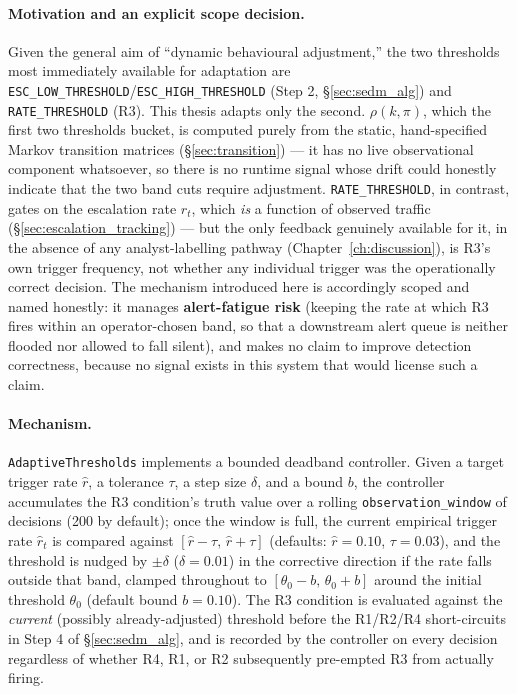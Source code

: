 \paragraph{Motivation and an explicit scope decision.}
Given the general aim of ``dynamic behavioural adjustment,'' the two
thresholds most immediately available for adaptation are
\texttt{ESC\_LOW\_THRESHOLD}/\texttt{ESC\_HIGH\_THRESHOLD} (Step 2,
\S\ref{sec:sedm_alg}) and \texttt{RATE\_THRESHOLD} (R3). This thesis adapts
only the second. $\rho(k, \pi)$, which the first two thresholds bucket, is
computed purely from the static, hand-specified Markov transition matrices
(\S\ref{sec:transition}) — it has no live observational component
whatsoever, so there is no runtime signal whose drift could honestly
indicate that the two band cuts require adjustment. \texttt{RATE\_THRESHOLD},
in contrast, gates on the escalation rate $r_t$, which \emph{is} a function
of observed traffic (\S\ref{sec:escalation_tracking}) — but the only
feedback genuinely available for it, in the absence of any analyst-labelling
pathway (Chapter~\ref{ch:discussion}), is R3's own trigger frequency, not
whether any individual trigger was the operationally correct decision. The
mechanism introduced here is accordingly scoped and named honestly: it
manages \textbf{alert-fatigue risk} (keeping the rate at which R3 fires
within an operator-chosen band, so that a downstream alert queue is neither
flooded nor allowed to fall silent), and makes no claim to improve
detection correctness, because no signal exists in this system that would
license such a claim.

\paragraph{Mechanism.}
\texttt{AdaptiveThresholds} implements a bounded deadband controller. Given
a target trigger rate $\hat{r}$, a tolerance $\tau$, a step size $\delta$,
and a bound $b$, the controller accumulates the R3 condition's truth value
over a rolling \texttt{observation\_window} of decisions (200 by default);
once the window is full, the current empirical trigger rate $\hat{r}_t$ is
compared against $[\hat{r} - \tau,\, \hat{r} + \tau]$ (defaults:
$\hat{r} = 0.10$, $\tau = 0.03$), and the threshold is nudged by $\pm\delta$
($\delta = 0.01$) in the corrective direction if the rate falls outside
that band, clamped throughout to $[\theta_0 - b,\, \theta_0 + b]$ around the
initial threshold $\theta_0$ (default bound $b = 0.10$). The R3 condition is
evaluated against the \emph{current} (possibly already-adjusted) threshold
before the R1/R2/R4 short-circuits in Step 4 of \S\ref{sec:sedm_alg}, and is
recorded by the controller on every decision regardless of whether R4, R1,
or R2 subsequently pre-empted R3 from actually firing.

